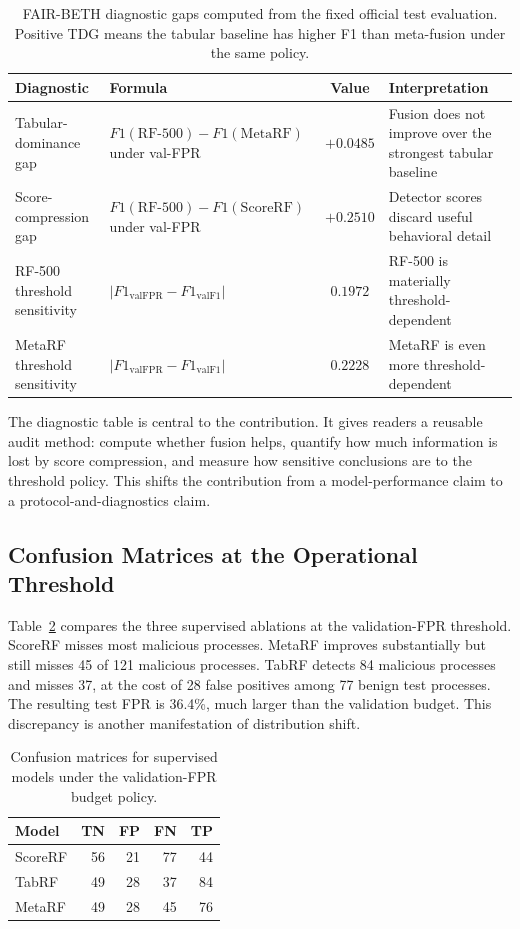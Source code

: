 \documentclass[10pt,journal,compsoc]{IEEEtran}
\begin{document}
\begin{table}[t]
\centering
\caption{FAIR-BETH diagnostic gaps computed from the fixed official test evaluation. Positive TDG means the tabular baseline has higher F1 than meta-fusion under the same policy.}
\label{tab:diagnostics}
\small
\begin{tabular}{p{3.2cm}p{5.0cm}cp{5.2cm}}
\toprule
\textbf{Diagnostic} & \textbf{Formula} & \textbf{Value} & \textbf{Interpretation} \\
\midrule
Tabular-dominance gap & $F1(\mathrm{RF\text{-}500})-F1(\mathrm{MetaRF})$ under val-FPR & $+0.0485$ & Fusion does not improve over the strongest tabular baseline \\
Score-compression gap & $F1(\mathrm{RF\text{-}500})-F1(\mathrm{ScoreRF})$ under val-FPR & $+0.2510$ & Detector scores discard useful behavioral detail \\
RF-500 threshold sensitivity & $|F1_{\mathrm{valFPR}}-F1_{\mathrm{valF1}}|$ & $0.1972$ & RF-500 is materially threshold-dependent \\
MetaRF threshold sensitivity & $|F1_{\mathrm{valFPR}}-F1_{\mathrm{valF1}}|$ & $0.2228$ & MetaRF is even more threshold-dependent \\
\bottomrule
\end{tabular}
\end{table}

The diagnostic table is central to the contribution. It gives readers a reusable audit method: compute whether fusion helps, quantify how much information is lost by score compression, and measure how sensitive conclusions are to the threshold policy. This shifts the contribution from a model-performance claim to a protocol-and-diagnostics claim.

\subsection{Confusion Matrices at the Operational Threshold}

Table~\ref{tab:cm_budget} compares the three supervised ablations at the validation-FPR threshold. ScoreRF misses most malicious processes. MetaRF improves substantially but still misses 45 of 121 malicious processes. TabRF detects 84 malicious processes and misses 37, at the cost of 28 false positives among 77 benign test processes. The resulting test FPR is 36.4\%, much larger than the validation budget. This discrepancy is another manifestation of distribution shift.

\begin{table}[t]
\centering
\caption{Confusion matrices for supervised models under the validation-FPR budget policy.}
\label{tab:cm_budget}
\begin{tabular}{lrrrr}
\toprule
\textbf{Model} & \textbf{TN} & \textbf{FP} & \textbf{FN} & \textbf{TP} \\
\midrule
ScoreRF & 56 & 21 & 77 & 44 \\
TabRF & 49 & 28 & 37 & 84 \\
MetaRF & 49 & 28 & 45 & 76 \\
\bottomrule
\end{tabular}
\end{table}
\end{document}
